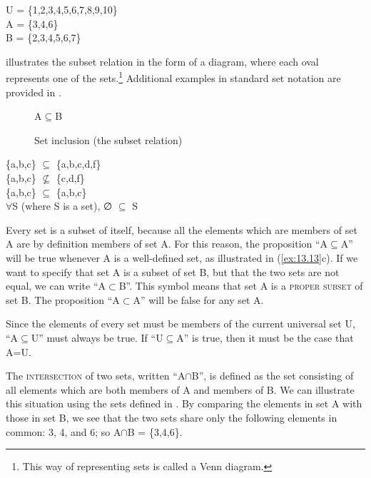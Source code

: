 \ea \label{ex:13.12}
U = \{1,2,3,4,5,6,7,8,9,10\}\\
A = \{3,4,6\}\\
B = \{2,3,4,5,6,7\}
\z


 illustrates the subset relation in the form of a diagram, where each oval represents one of the sets.\footnote{This way of representing sets is called a Venn diagram.} Additional examples in standard set notation are provided in .


\begin{figure}

  \textsf{A}\small{${\subseteq}$}\textsf{B}\\

\caption{\label{fig:13:1} Set inclusion (the subset relation)}
\end{figure}

\ea \label{ex:13.13}
\ea  \{a,b,c\} ${\subseteq}$ \{a,b,c,d,f\}\\
\ex \{a,b,c\} ${\nsubseteq}$ \{c,d,f\} \\
\ex \{a,b,c\} ${\subseteq}$ \{a,b,c\}\\
\ex ${\forall}$S (where S is a set), ∅ ${\subseteq}$ S
                       \z
\z


Every set is a subset of itself, because all the elements which are members of set A are by definition members of set A. For this reason, the proposition “A${\subseteq}$A” will be true whenever A is a well-defined set, as illustrated in (\ref{ex:13.13}c). If we want to specify that set A is a subset of set B, but that the two sets are not equal, we can write “A${\subset}$B”. This symbol means that set A is a \textsc{proper subset} of set B. The proposition “A${\subset}$A” will be false for any set A.



Since the elements of every set must be members of the current universal set U, “A${\subseteq}$U” must always be true. If “U${\subseteq}$A” is true, then it must be the case that A=U.



The \textsc{intersection} of two sets, written “A${\cap}$B”, is defined as the set consisting of all elements which are both members of A and members of B. We can illustrate this situation using the sets defined in . By comparing the elements in set A with those in set B, we see that the two sets share only the following elements in common: 3, 4, and 6; so A${\cap}$B = \{3,4,6\}.


